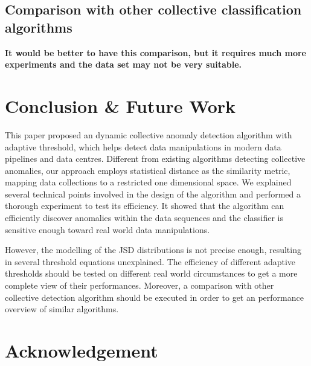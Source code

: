 \documentclass[a4paper]{IEEEtran}
\begin{document}
\begin{table}[!ht]
			\end{table}
		
		\subsection{Comparison with other collective classification algorithms}
			\textbf{It would be better to have this comparison, but it requires much more experiments and the data set may not be very suitable.}
			
	\section{Conclusion \& Future Work}\label{sec:conclusion}
		This paper proposed an dynamic collective anomaly detection algorithm with adaptive threshold, which helps detect data manipulations in modern data pipelines and data centres. Different from existing algorithms detecting collective anomalies, our approach employs statistical distance as the similarity metric, mapping data collections to a restricted one dimensional space. We explained several technical points involved in the design of the algorithm and performed a thorough experiment to test its efficiency. It showed that the algorithm can efficiently discover anomalies within the data sequences and the classifier is sensitive enough toward real world data manipulations.
		
		However, the modelling of the JSD distributions is not precise enough, resulting in several threshold equations unexplained. The efficiency of different adaptive thresholds should be tested on different real world circumstances to get a more complete view of their performances. Moreover, a comparison with other collective detection algorithm should be executed in order to get an performance overview of similar algorithms.
	
	\section*{Acknowledgement}
		
	\printbibliography
\end{document}
